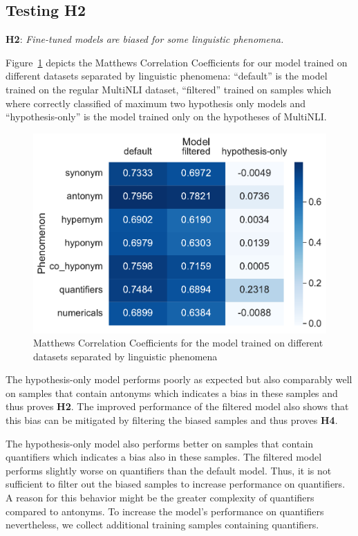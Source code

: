 \subsection{Testing H2}
\textbf{H2}: \textit{Fine-tuned models are biased for some linguistic phenomena.}

Figure~\ref{fig:metric-heatmap-phenomena-mcc} depicts the Matthews Correlation Coefficients for our model trained on different datasets separated by linguistic phenomena: \enquote{default} is the model trained on the regular \ac{MultiNLI} dataset, \enquote{filtered} trained on samples which where correctly classified of maximum two hypothesis only models and \enquote{hypothesis-only} is the model trained only on the hypotheses of \ac{MultiNLI}.

\begin{figure}[ht]
    \centering
    \includegraphics[width=0.9\columnwidth]{./images/metric_heatmaps_phenomena/important_words/matthews_correlation.pdf}
    \caption{Matthews Correlation Coefficients for the model trained on different datasets separated by linguistic phenomena}
    \label{fig:metric-heatmap-phenomena-mcc}
\end{figure}

The hypothesis-only model performs poorly as expected but also comparably well on samples that contain antonyms which indicates a bias in these samples and thus proves \textbf{H2}. The improved performance of the filtered model also shows that this bias can be mitigated by filtering the biased samples and thus proves \textbf{H4}.

The hypothesis-only model also performs better on samples that contain quantifiers which indicates a bias also in these samples. The filtered model performs slightly worse on quantifiers than the default model. Thus, it is not sufficient to filter out the biased samples to increase performance on quantifiers. A reason for this behavior might be the greater complexity of quantifiers compared to antonyms. To increase the model's performance on quantifiers nevertheless, we collect additional training samples containing quantifiers.


